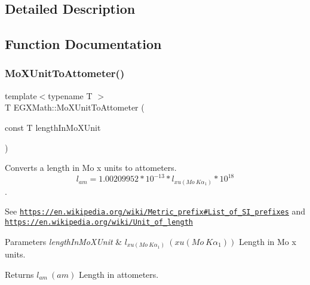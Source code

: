 \subsection{Detailed Description}


\subsection{Function Documentation}
\mbox{\label{group___e_g_x_math-_conversions-_length_conversions-_non-_s_i-_mo_x_unit-_s_i_gae503164583f30916aea60eda17993712}} 
\subsubsection{\texorpdfstring{Mo\+X\+Unit\+To\+Attometer()}{MoXUnitToAttometer()}}
{\footnotesize\ttfamily template$<$typename T $>$ \\
T E\+G\+X\+Math\+::\+Mo\+X\+Unit\+To\+Attometer (\begin{DoxyParamCaption}\item[{const T}]{length\+In\+Mo\+X\+Unit }\end{DoxyParamCaption})}



Converts a length in Mo x units to attometers. \[ l_{am}=1.00209952*10^{-13} * l_{xu(Mo\ K\alpha_1)} * 10^{18} \]. 

See \href{https://en.wikipedia.org/wiki/Metric_prefix#List_of_SI_prefixes}{\tt https\+://en.\+wikipedia.\+org/wiki/\+Metric\+\_\+prefix\#\+List\+\_\+of\+\_\+\+S\+I\+\_\+prefixes} and \href{https://en.wikipedia.org/wiki/Unit_of_length}{\tt https\+://en.\+wikipedia.\+org/wiki/\+Unit\+\_\+of\+\_\+length} 
\begin{DoxyParams}{Parameters}
{\em length\+In\+Mo\+X\+Unit} & $ l_{xu(Mo\ K\alpha_1)}\ (xu(Mo\ K\alpha_1))$ Length in Mo x units. \\
\hline
\end{DoxyParams}
\begin{DoxyReturn}{Returns}
$ l_{am}\ (am)$ Length in attometers. 
\end{DoxyReturn}
\mbox{\label{group___e_g_x_math-_conversions-_length_conversions-_non-_s_i-_mo_x_unit-_s_i_ga50ad909022e97526fb43b5887e58f1d7}} 
